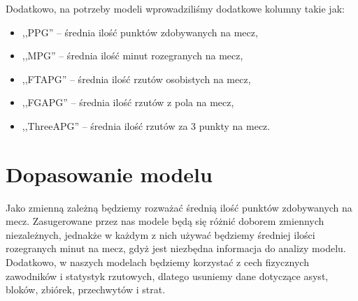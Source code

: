 \documentclass[11pt,a4paper]{article}
\begin{document}
	Dodatkowo, na potrzeby modeli wprowadziliśmy dodatkowe kolumny takie jak:
\begin{itemize}	
	\item ,,PPG'' -- średnia ilość punktów zdobywanych na mecz,
	\item ,,MPG'' -- średnia ilość minut rozegranych na mecz,
	\item ,,FTAPG'' -- średnia ilość rzutów osobistych na mecz,
	\item ,,FGAPG'' -- średnia ilość rzutów z pola na mecz,
	\item ,,ThreeAPG'' -- średnia ilość rzutów za 3 punkty na mecz.
\end{itemize}
	
\section{Dopasowanie modelu}
Jako zmienną zależną będziemy rozważać średnią ilość punktów zdobywanych na mecz. Zasugerowane przez nas modele będą się różnić doborem zmiennych niezależnych, jednakże w każdym z nich używać będziemy średniej ilości rozegranych minut na mecz, gdyż jest niezbędna informacja do analizy modelu. Dodatkowo, w naszych modelach będziemy korzystać z cech fizycznych zawodników i statystyk rzutowych, dlatego usuniemy dane dotyczące asyst, bloków, zbiórek, przechwytów i strat.
\end{document}
